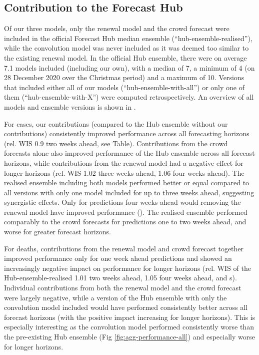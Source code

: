 \documentclass[10pt,letterpaper]{article}
\begin{document}
\hypertarget{contribution-to-the-forecast-hub}{%
\subsection{Contribution to the Forecast
Hub}\label{contribution-to-the-forecast-hub}}

\label{contributions-hub}

Of our three models, only the renewal model and the crowd forecast were
included in the official Forecast Hub median ensemble
(``hub-ensemble-realised''), while the convolution model was never
included as it was deemed too similar to the existing renewal model. In
the official Hub ensemble, there were on average 7.1 models included
(including our own), with a median of 7, a minimum of 4 (on 28 December
2020 over the Christmas period) and a maximum of 10. Versions that
included either all of our models (``hub-ensemble-with-all'') or only
one of them (``hub-ensemble-with-X'') were computed retrospectively. An
overview of all models and ensemble versions is shown in
.

For cases, our contributions (compared to the Hub ensemble without our
contributions) consistently improved performance across all forecasting
horizons (rel. WIS 0.9 two weeks ahead, see
 Table). Contributions from the
crowd forecasts alone also improved performance of the Hub ensemble
across all forecast horizons, while contributions from the renewal model
had a negative effect for longer horizons (rel. WIS 1.02 three weeks
ahead, 1.06 four weeks ahead). The realised ensemble including both
models performed better or equal compared to all versions with only one
model included for up to three weeks ahead, suggesting synergistic
effects. Only for predictions four weeks ahead would removing the
renewal model have improved performance
(). The realised ensemble performed
comparably to the crowd forecasts for predictions one to two weeks
ahead, and worse for greater forecast horizons.

For deaths, contributions from the renewal model and crowd forecast
together improved performance only for one week ahead predictions and
showed an increasingly negative impact on performance for longer
horizons (rel. WIS of the Hub-ensemble-realised 1.01 two weeks ahead,
1.05 four weeks ahead,  and
s). Individual contributions from
both the renewal model and the crowd forecast were largely negative,
while a version of the Hub ensemble with only the convolution model
included would have performed consistently better across all forecast
horizons (with the positive impact increasing for longer horizons). This
is especially interesting as the convolution model performed
consistently worse than the pre-existing Hub ensemble (Fig
\ref{fig:agg-performance-all}) and especially worse for longer horizons.
\end{document}
